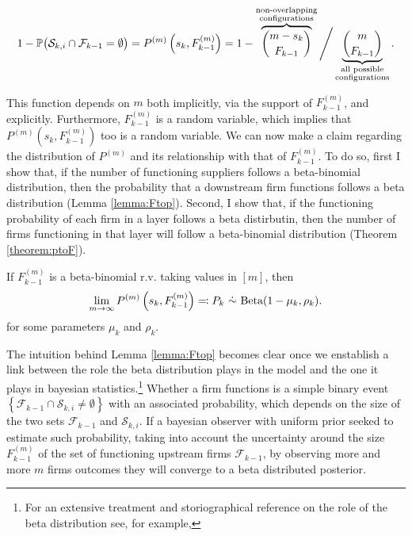\documentclass[../../main.tex]{subfiles}
\begin{document}
\begin{equation}
  1 - \P\big( \mathcal{S}_{k, i} \cap \mathcal{F}_{k - 1} = \emptyset \big) = P^{(m)}\left(s_k, F^{(m)}_{k - 1}\right) =  1 - \overbrace{\binom{m - s_k}{F_{k-1}}}^{\substack{\text{non-overlapping} \\ \text{configurations}}} \Bigg/ \underbrace{\binom{m}{F_{k-1}}}_{\substack{\text{all possible} \\ \text{configurations}}}. 
\end{equation}

This function depends on $m$ both implicitly, via the support of $F^{(m)}_{k-1}$, and explicitly. Furthermore, $F^{(m)}_{k - 1}$ is a random variable, which implies that $P^{(m)}(s_k, F^{(m)}_{k - 1})$ too is a random variable. We can now make a claim regarding the distribution of $P^{(m)}$ and its relationship with that of $F^{(m)}_{k - 1}$. To do so, first I show that, if the number of functioning suppliers follows a beta-binomial distribution, then the probability that a downstream firm functions follows a beta distribution (Lemma \ref{lemma:Ftop}). Second, I show that, if the functioning probability of each firm in a layer follows a beta distirbutin, then the number of firms functioning in that layer will follow a beta-binomial distribution (Theorem \ref{theorem:ptoF}).

\begin{lemma} \label{lemma:Ftop}
  If $F^{(m)}_{k-1}$ is a beta-binomial r.v. taking values in $[m]$, then \begin{equation*}\lim_{m \rightarrow \infty} P^{(m)}\left(s_k, F^{(m)}_{k - 1}\right) \eqqcolon P_k \ \dot{\sim} \ \Beta(1 - \mu_k, \rho_k).\end{equation*} for some parameters $\mu_k$ and $\rho_k$.
\end{lemma}

The intuition behind Lemma \ref{lemma:Ftop} becomes clear once we enstablish a link between the role the beta distribution plays in the model and the one it plays in bayesian statistics.\footnote{For an extensive treatment and storiographical reference on the role of the beta distribution see, for example,  }
Whether a firm functions is a simple binary event $\left\{\mathcal{F}_{k - 1} \cap \mathcal{S}_{k, i} \neq \emptyset \right\}$ with an associated probability, which depends on the size of the two sets $\mathcal{F}_{k - 1}$ and $\mathcal{S}_{k, i}$. If a bayesian observer with uniform prior seeked to estimate such probability, taking into account the uncertainty around the size $F^{(m)}_{k-1}$ of the set of functioning upstream firms $\mathcal{F}_{k - 1}$, by observing more and more $m$ firms outcomes they will converge to a beta distributed posterior.
\end{document}

